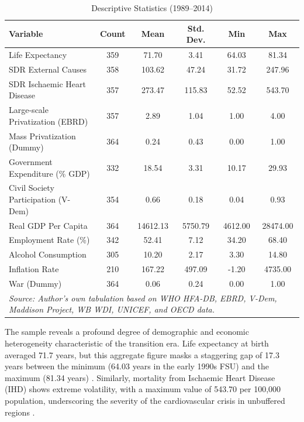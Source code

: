 \documentclass[en,magisterska]{pracamgr}
\begin{document}
\begin{table}[ht]
\centering
\caption{Descriptive Statistics (1989--2014)}
\label{tab:desc_stats}
\footnotesize
\begin{tabular}{l c c c c c}
\toprule
\textbf{Variable} & \textbf{Count} & \textbf{Mean} & \textbf{Std. Dev.} & \textbf{Min} & \textbf{Max} \\
\midrule
Life Expectancy & 359 & 71.70 & 3.41 & 64.03 & 81.34 \\
SDR External Causes & 358 & 103.62 & 47.24 & 31.72 & 247.96 \\
SDR Ischaemic Heart Disease & 357 & 273.47 & 115.83 & 52.52 & 543.70 \\
\midrule
Large-scale Privatization (EBRD) & 357 & 2.89 & 1.04 & 1.00 & 4.00 \\
Mass Privatization (Dummy) & 364 & 0.24 & 0.43 & 0.00 & 1.00 \\
Government Expenditure (\% GDP) & 332 & 18.54 & 3.31 & 10.17 & 29.93 \\
Civil Society Participation (V-Dem) & 354 & 0.66 & 0.18 & 0.04 & 0.93 \\
\midrule
Real GDP Per Capita & 364 & 14612.13 & 5750.79 & 4612.00 & 28474.00 \\
Employment Rate (\%) & 342 & 52.41 & 7.12 & 34.20 & 68.40 \\
Alcohol Consumption & 305 & 10.20 & 2.17 & 3.30 & 14.80 \\
Inflation Rate & 210 & 167.22 & 497.09 & -1.20 & 4735.00 \\
War (Dummy) & 364 & 0.06 & 0.24 & 0.00 & 1.00 \\
\bottomrule
\multicolumn{6}{p{0.95\textwidth}}{\scriptsize \textit{Source: Author's own tabulation based on WHO HFA-DB, EBRD, V-Dem, Maddison Project, WB WDI, UNICEF, and OECD data.}} \
\end{tabular}
\end{table}


The sample reveals a profound degree of demographic and economic heterogeneity characteristic of the transition era. Life expectancy at birth averaged 
71.7 years, but this aggregate figure masks a staggering gap of 17.3 years between the minimum (64.03 years in the early 1990s FSU) and the maximum 
(81.34 years) \citep{Brainerd2005}. Similarly, mortality from Ischaemic Heart Disease (IHD) shows extreme volatility, with a maximum value of 543.70 per 
100,000 population, underscoring the severity of the cardiovascular crisis in unbuffered regions \citep{Zaridze2009, Brainerd2001}. 
\end{document}
